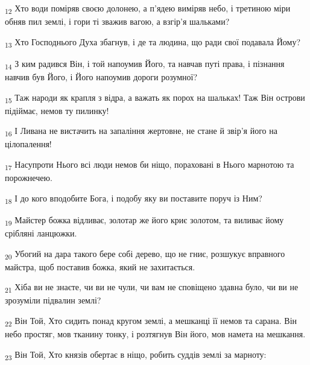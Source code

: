 \begin{tcolorbox}
\textsubscript{12} Хто води поміряв своєю долонею, а п'ядею виміряв небо, і третиною міри обняв пил землі, і гори ті зважив вагою, а взгір'я шальками?
\end{tcolorbox}
\begin{tcolorbox}
\textsubscript{13} Хто Господнього Духа збагнув, і де та людина, що ради свої подавала Йому?
\end{tcolorbox}
\begin{tcolorbox}
\textsubscript{14} З ким радився Він, і той напоумив Його, та навчав путі права, і пізнання навчив був Його, і Його напоумив дороги розумної?
\end{tcolorbox}
\begin{tcolorbox}
\textsubscript{15} Таж народи як крапля з відра, а важать як порох на шальках! Таж Він острови підіймає, немов ту пилинку!
\end{tcolorbox}
\begin{tcolorbox}
\textsubscript{16} І Ливана не вистачить на запаління жертовне, не стане й звір'я його на цілопалення!
\end{tcolorbox}
\begin{tcolorbox}
\textsubscript{17} Насупроти Нього всі люди немов би ніщо, пораховані в Нього марнотою та порожнечею.
\end{tcolorbox}
\begin{tcolorbox}
\textsubscript{18} І до кого вподобите Бога, і подобу яку ви поставите поруч із Ним?
\end{tcolorbox}
\begin{tcolorbox}
\textsubscript{19} Майстер божка відливає, золотар же його криє золотом, та виливає йому срібляні ланцюжки.
\end{tcolorbox}
\begin{tcolorbox}
\textsubscript{20} Убогий на дара такого бере собі дерево, що не гниє, розшукує вправного майстра, щоб поставив божка, який не захитається.
\end{tcolorbox}
\begin{tcolorbox}
\textsubscript{21} Хіба ви не знаєте, чи ви не чули, чи вам не сповіщено здавна було, чи ви не зрозуміли підвалин землі?
\end{tcolorbox}
\begin{tcolorbox}
\textsubscript{22} Він Той, Хто сидить понад кругом землі, а мешканці її немов та сарана. Він небо простяг, мов тканину тонку, і розтягнув Він його, мов намета на мешкання.
\end{tcolorbox}
\begin{tcolorbox}
\textsubscript{23} Він Той, Хто князів обертає в ніщо, робить суддів землі за марноту:
\end{tcolorbox}
